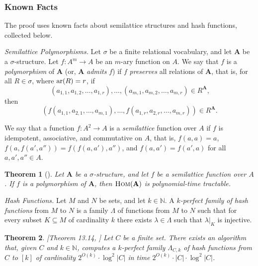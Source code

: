 \documentclass[usletter]{article}
\newtheorem{theorem}{Theorem}
\begin{document}
\subsubsection{Known Facts}\label{sect:prim}

The proof uses known facts about semilattice structures and hash functions, collected below.  

\medskip

\noindent \textit{Semilattice Polymorphisms.}  
Let $\sigma$ be a finite relational vocabulary, and let $\mathbf{A}$ be a
$\sigma$-structure.  Let $f \colon A^m \to A$ 
be an $m$-ary function on $A$.  We say that $f$ is a \emph{polymorphism} of $\mathbf{A}$ 
(or, $\mathbf{A}$ \emph{admits} $f$) 
if $f$ \emph{preserves} all relations of $\mathbf{A}$, that is, 
for all $R \in \sigma$, where $\textup{ar}(R)=r$, if 
$$(a_{1,1},a_{1,2},\ldots,a_{1,r}),\ldots,(a_{m,1},a_{m,2},\ldots,a_{m,r}) \in R^\mathbf{A}\text{,}$$  
then 
$$(
f(a_{1,1},a_{2,1},\ldots,a_{m,1}),
\ldots,
f(a_{1,r},a_{2,r},\ldots,a_{m,r})
) \in R^\mathbf{A}\text{.}$$

We say that a function $f \colon A^2 \to A$ is a \emph{semilattice} function over $A$ if 
$f$ is idempotent, associative, and commutative on $A$, 
that is, $f(a,a)=a$, $f(a,f(a',a''))=f(f(a,a'),a'')$, and $f(a,a')=f(a',a)$ for all $a,a',a'' \in A$.  

\begin{theorem}[\cite{JeavonsCohenGyssens97}]\label{th:semilpoly}
Let $\mathbf{A}$ be a $\sigma$-structure, 
and let $f$ be a semilattice function over $A$.  
If $f$ is a polymorphism of $\mathbf{A}$, 
then $\textsc{Hom}(\mathbf{A})$ is polynomial-time tractable.
\end{theorem}

\medskip

\noindent \textit{Hash Functions.}  Let $M$ and $N$ be sets, and let $k \in \mathbb{N}$.  
A \emph{$k$-perfect family of hash functions} from $M$ to $N$ 
is a family $\Lambda$ of functions from $M$ to $N$ 
such that for every subset $K \subseteq M$ of cardinality $k$ 
there exists $\lambda \in \Lambda$ such that $\lambda|_K$ 
is injective. 



\begin{theorem}\label{th:hash}[Theorem 13.14, \cite{FlumGrohe06}]
Let $C$ be a finite set.  There exists an algorithm that, given $C$ and $k \in \mathbb{N}$, 
computes a $k$-perfect family $\Lambda_{C,k}$ of hash functions from $C$ to $[k]$ 
of cardinality $2^{O(k)} \cdot \log^2 |C|$ in time $2^{O(k)} \cdot |C| \cdot \log^2 |C|$.  
\end{theorem}
\end{document}
